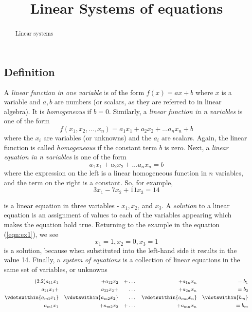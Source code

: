 \documentclass{ximera}
\title{Linear Systems of equations}
\begin{document}
\begin{abstract}
  Linear systems
\end{abstract}

\maketitle


\subsection{Definition} A {\it linear function in one variable} is of the form $f(x) = ax+b$ where $x$ is a variable and $a,b$ are numbers (or scalars, as they are referred to in linear algebra). It is {\it homogeneous} if $b=0$. Similarly, a {\it linear function in n variables} is one of the form
\[
f(x_1,x_2,\dots,x_n) = a_1x_1 + a_2x_2 + \dots a_nx_n + b
\]
where the $x_i$ are variables (or unknowns) and the $a_i$ are scalars. Again, the linear function is called {\it homogeneous} if the constant term $b$ is zero. Next, a {\it linear equation in n variables} is one of the form
\[
a_1x_1 + a_2x_2 + \dots a_nx_n =  b
\]
where the expression on the left is a linear homogeneous function in $n$ variables, and the term on the right is a constant. So, for example, 
\begin{equation}\label{eqn:ex1}
3x_1 - 7x_2 + 11x_3 = 14
\end{equation}

is a linear equation in three variables - $x_1, x_2$, and $x_3$. A {\it solution} to a linear equation is an assignment of values to each of the variables appearing which makes the equation hold true. Returning to the example in the equation (\ref{eqn:ex1}), we see
\[
x_1 = 1, x_2 = 0, x_3 = 1
\]
is a solution, because when substituted into the left-hand side it results in the value 14. Finally, a {\it system of equations} is a collection of linear equations in the same set of variables, or unknowns
\begin{alignat*}{5}\tag{2.2}\label{eqn:sys}
a_{11}x_1 &&+ a_{12}x_2 && + {}\ldots{} && + a_{1n}x_n && =  b_1 &\\
a_{21}x_1 + && a_{22}x_2 + &&  {}\ldots{} && + a_{2n}x_n &&  = b_2 &\\
\vdotswithin{a_{m1}x_1} &&  \vdotswithin{a_{m2}x_2} &&  {}\ldots{} &&  \vdotswithin{a_{mn}x_n} &&   \vdotswithin{b_m} &\\
a_{m1}x_1 &&+ a_{m2}x_2 && + {}\ldots{} && + a_{mn}x_n && =  b_m &
\end{alignat*}
\end{document}
